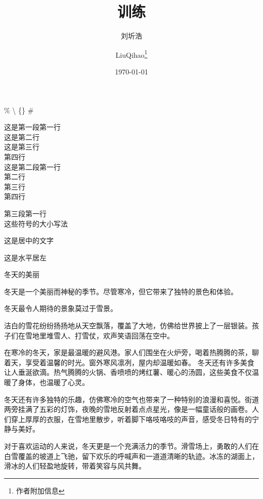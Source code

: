 \documentclass{article} %
\title{训练} %
\author{刘圻浩 \and LiuQihao\thanks{作者附加信息}} %
\date{\today} %
\begin{document}
\maketitle %

\% %
\textbackslash %
\{\} %
\# %

这是第一段第一行\\
这是第二行\\
这是第三行\\
第四行\\

这是第二段第一行\\ %
第二行\\
第三行\\
第四行\par %
第三段第一行\\
这些符号的大小\hspace{1em}写法\\ %
\begin{center} %
    这是居中的文字
\end{center}
\begin{flushleft}
    这是水平居左
\end{flushleft}\par
\begin{center}
冬天的美丽   
\end{center}\par
冬天是一个美丽而神秘的季节。尽管寒冷，但它带来了独特的景色和体验。
\begin{flushright}
冬天最令人期待的景象莫过于雪景。
\end{flushright}\par
洁白的雪花纷纷扬扬地从天空飘落，覆盖了大地，仿佛给世界披上了一层银装。孩子们在雪地里堆雪人、打雪仗，欢声笑语回荡在空中。\par
在寒冷的冬天，家是最温暖的避风港。家人们围坐在火炉旁，喝着热腾腾的茶，聊着天，享受着温馨的时光。窗外寒风凛冽，屋内却温暖如春。
冬天还有许多美食让人垂涎欲滴。热气腾腾的火锅、香喷喷的烤红薯、暖心的汤圆，这些美食不仅温暖了身体，也温暖了心灵。\par
\noindent
冬天还有许多独特的乐趣，仿佛寒冷的空气也带来了一种特别的浪漫和喜悦。街道两旁挂满了五彩的灯饰，夜晚的雪地反射着点点星光，像是一幅童话般的画卷。人们穿上厚厚的衣服，在雪地里散步，听着脚下咯吱咯吱的声音，感受冬日特有的宁静与美好。
\begin{spacing}{2} %
对于喜欢运动的人来说，冬天更是一个充满活力的季节。滑雪场上，勇敢的人们在白雪覆盖的坡道上飞驰，留下欢乐的呼喊声和一道道清晰的轨迹。冰冻的湖面上，滑冰的人们轻盈地旋转，带着笑容与风共舞。
\end{spacing}
\end{document}
